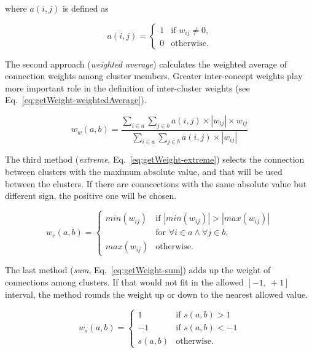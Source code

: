 \documentclass[graybox]{svmult}
\begin{document}
\noindent where $a(i,j)$ is defined as

\begin{equation}
  \label{eq:isConnection}
  a(i,j) = \left\{ \begin{array}{ll} 
                     1 & \textrm{if } w_{ij} \neq 0 \textrm{,} \\
                     0 & \textrm{otherwise.}
                   \end{array} \right.
\end{equation}

The second approach (\emph{weighted average}) calculates the weighted 
average of connection weights among cluster members. Greater 
inter-concept weights play more important role in the definition of 
inter-cluster weights (see Eq.~\ref{eq:getWeight-weightedAverage}).

\begin{equation}
  \label{eq:getWeight-weightedAverage}
  w_w(a,b) = \frac{\sum_{i \in a} \sum_{j \in b} a(i,j) \times |w_{ij}| \times w_{ij}}{\sum_{i \in a} \sum_{j \in b} a(i,j) 
\times |w_{ij}|}
\end{equation}

The third method (\emph{extreme}, Eq.~\ref{eq:getWeight-extreme}) selects 
the connection between clusters with the maximum absolute value, and 
that will be used between the clusters. If there are conncections 
with the same absolute value but different sign, the positive one 
will be chosen.

\begin{equation}
  \label{eq:getWeight-extreme}
  w_e(a,b) = \left\{ \begin{array}{ll}
                       min(w_{ij}) & \textrm{if } \left| min(w_{ij}) \right| > \left| max(w_{ij}) \right| \\
                       & \textrm{for } \forall i \in a \wedge \forall j \in b \textrm{,} \\
                       max(w_{ij}) & \textrm{otherwise.}
                     \end{array} \right.
\end{equation}

The last method (\emph{sum}, Eq.~\ref{eq:getWeight-sum}) adds up the 
weight of connections among clusters. If that would not fit in the 
allowed $[-1,~+1]$ interval, the method rounds the weight up or 
down to the nearest allowed value.

\begin{equation}
  \label{eq:getWeight-sum}
  w_s(a,b) = \left\{ \begin{array}{ll}
                       1 & \textrm{if } s(a,b) > 1 \\
                       -1 & \textrm{if } s(a,b) < -1 \\
                       s(a,b) & \textrm{otherwise.}
                     \end{array} \right.
\end{equation}
\end{document}
